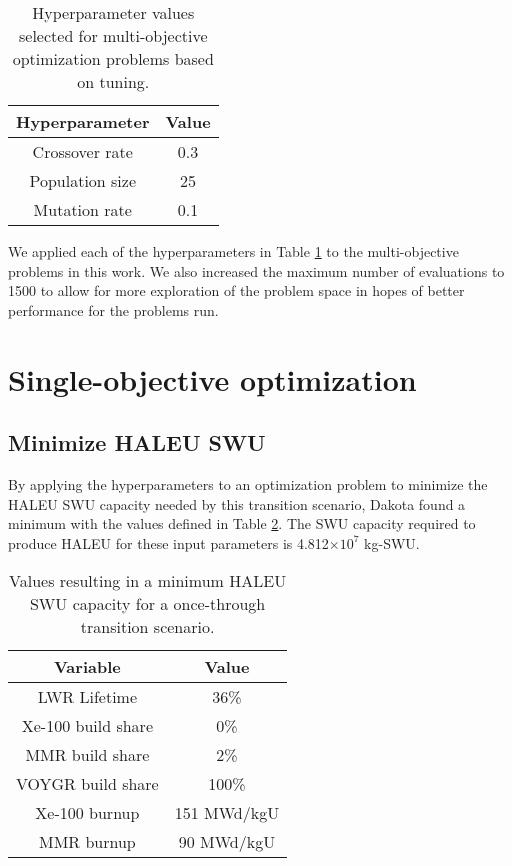 \begin{table}
    \centering 
    \caption{Hyperparameter values selected for multi-objective 
    optimization problems based on tuning.}
    \label{tab:moga_parameters}
    \begin{tabular}{c c}
        \hline
        Hyperparameter & Value \\
        \hline
        Crossover rate & 0.3\\
        Population size & 25\\
        Mutation rate & 0.1\\
        \hline
    \end{tabular}
\end{table}

We applied each of the hyperparameters in Table \ref{tab:moga_parameters}
to the multi-objective problems in this work. We also increased the 
maximum number of evaluations to 1500 to allow for more exploration 
of the problem space in hopes of better performance for the problems 
run. 

\section{Single-objective optimization}
\subsection{Minimize HALEU SWU}
By applying the hyperparameters to an optimization problem to minimize the 
\gls{HALEU} \gls{SWU} capacity needed by this transition scenario, Dakota
found a minimum with the values defined in Table \ref{tab:soga_ot_haleu}.
The \gls{SWU} capacity required to produce \gls{HALEU} for these input 
parameters is 4.812$\times 10^7$ kg-SWU.

\begin{table}
    \centering 
    \caption{Values resulting in a minimum \gls{HALEU} \gls{SWU} capacity for 
              a once-through transition scenario.}
    \label{tab:soga_ot_haleu}
    \begin{tabular}{c c}
        \hline
        Variable & Value \\
        \hline
        LWR Lifetime & 36\%\\
        Xe-100 build share & 0\%\\
        MMR build share & 2\%\\
        VOYGR build share & 100\%\\
        Xe-100 burnup & 151 MWd/kgU\\
        MMR burnup & 90 MWd/kgU\\
        \hline
    \end{tabular}
\end{table}

